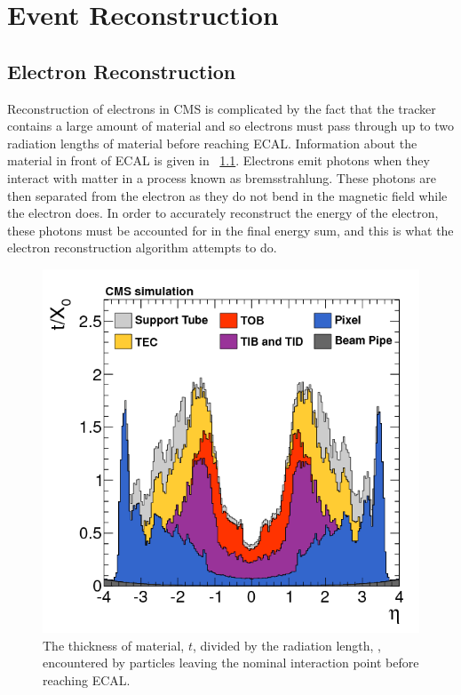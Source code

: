 \chapter{Event Reconstruction}
\label{chapter:reconstruction}

\section{Electron Reconstruction}
\label{sec:electron_reconstruction}

Reconstruction of electrons in CMS is complicated by the fact that the tracker
contains a large amount of material and so electrons must pass through up to
two radiation lengths of material before reaching ECAL. Information about the
material in front of ECAL is given in
\FIG~\ref{fig:tracker_material}\cite{cms_tracker_2014}. Electrons emit photons
when they interact with matter in a process known as bremsstrahlung. These
photons are then separated from the electron as they do not bend in the
magnetic field while the electron does. In order to accurately reconstruct the
energy of the electron, these photons must be accounted for in the final energy
sum, and this is what the electron reconstruction algorithm attempts to do.

\begin{figure}[!htbp]
    \centering
    \includegraphics[width=\textwidth]{figures/tracker_material_budget.png}
    \caption[
        Material thickness infront of of ECAL.
    ]{
        The thickness of material, $t$, divided by the radiation length,
        \radiationlength, encountered by particles leaving the nominal
        interaction point before reaching ECAL.
    }
    \label{fig:tracker_material}
\end{figure}

